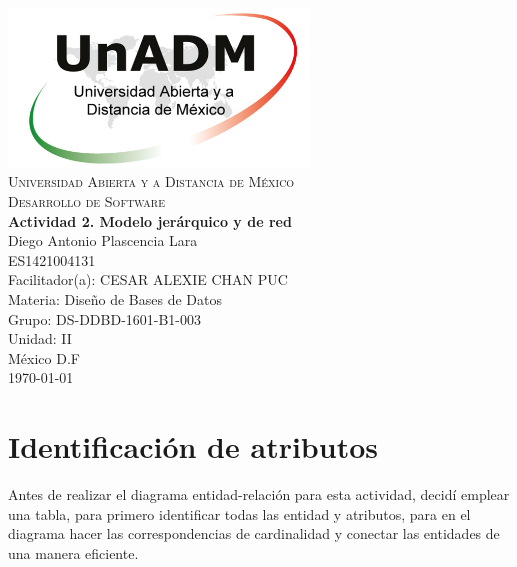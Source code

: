 \documentclass[spanish,12pt,letterpapper]{article}
\begin{document}
	\begin{titlepage}
		\begin{center}
			\includegraphics[width=0.6\textwidth]{../logoUnADM}~\\[1cm] 
			\textsc{Universidad Abierta y a Distancia de México}\\[0.8cm]
			\textsc{Desarrollo de Software}\\[1.8cm]
			
			\textbf{ \Large Actividad 2. Modelo jerárquico y de red}\\[3cm]
			
			Diego Antonio Plascencia Lara\\ ES1421004131 \\[0.4cm]
			Facilitador(a): CESAR ALEXIE CHAN PUC  \\
			Materia: Diseño de Bases de Datos\\
			Grupo: DS-DDBD-1601-B1-003 \\
			Unidad: II \\
			
			\vfill México D.F\\{\today}
			
		\end{center}
	\end{titlepage}
	\section{Identificación de atributos}
	Antes de realizar el diagrama entidad-relación para esta actividad, decidí emplear una tabla, para primero identificar todas las entidad y atributos, para en el diagrama hacer las correspondencias de cardinalidad y conectar las entidades de una manera eficiente.
	
\end{document}
